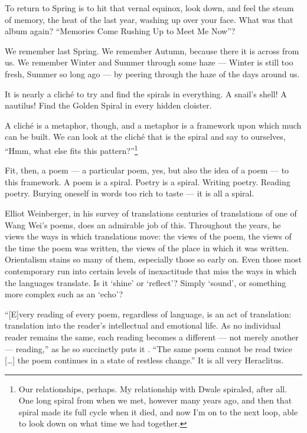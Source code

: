 \documentclass[12pt]{memoir}
\begin{document}
To return to Spring is to hit that vernal equinox, look down, and feel the steam of memory, the heat of the last year, washing up over your face. What was that album again? ``Memories Come Rushing Up to Meet Me Now''?

We remember last Spring. We remember Autumn, because there it is across from us. We remember Winter and Summer through some haze --- Winter is still too fresh, Summer so long ago --- by peering through the haze of the days around us.

It is nearly a cliché to try and find the spirals in everything. A snail's shell! A nautilus! Find the Golden Spiral in every hidden cloister.

A cliché is a metaphor, though, and a metaphor is a framework upon which much can be built. We can look at the cliché that is the spiral and say to ourselves, ``Hmm, what else fits this pattern?''\footnote{Our relationships, perhaps. My relationship with Dwale spiraled, after all. One long spiral from when we met, however many years ago, and then that spiral made its full cycle when it died, and now I'm on to the next loop, able to look down on what time we had together.}

Fit, then, a poem --- a particular poem, yes, but also the idea of a poem --- to this framework. A poem is a spiral. Poetry is a spiral. Writing poetry. Reading poetry. Burying oneself in words too rich to taste --- it is all a spiral.

Elliot Weinberger, in his survey of translations centuries of translations of one of Wang Wei's poems, does an admirable job of this. Throughout the years, he views the ways in which translations move: the views of the poem, the views of the time the poem was written, the views of the place in which it was written. Orientalism stains so many of them, especially those so early on. Even those most contemporary run into certain levels of inexactitude that miss the ways in which the languages translate. Is it `shine' or `reflect'? Simply `sound', or something more complex such as an `echo'?

``{[E]}very reading of every poem, regardless of language, is an act of translation: translation into the reader's intellectual and emotional life. As no individual reader remains the same, each reading becomes a different --- not merely another --- reading,'' as he so succinctly puts it \parencite[46]{wangwei}. ``The same poem cannot be read twice {[\ldots]} the poem continues in a state of restless change.'' It is all very Heraclitus.
\end{document}
